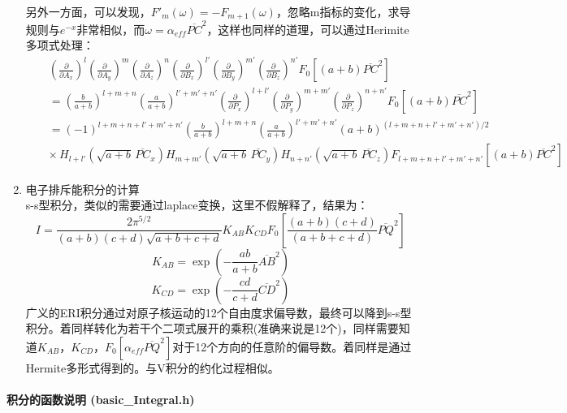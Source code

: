 \documentclass[11pt]{article}
\begin{document}
\begin{enumerate}
\[\begin{eqnarray}
  \end{eqnarray}\]
  另外一方面，可以发现，\(F'_m(\omega)=- F_{m+1}(\omega)\)，忽略m指标的变化，求导规则与\(e^{-x}\)非常相似，而\(\omega=\alpha_{eff}\overline{PC}^2\)，这样也同样的道理，可以通过Herimite多项式处理：
  \[\begin{eqnarray}
  &&(\frac{\partial}{\partial A_x})^l(\frac{\partial}{\partial A_y})^m(\frac{\partial}{\partial A_z})^n
  (\frac{\partial}{\partial B_x})^{l'}(\frac{\partial}{\partial B_y})^{m'}(\frac{\partial}{\partial B_z})^{n'}
  F_0[(a+b)\overline{PC}^2] \\
  &&= (\frac{b}{a+b})^{l+m+n}(\frac{a}{a+b})^{l'+m'+n'}(\frac{\partial}{\partial P_x})^{l+l'}(\frac{\partial}{\partial P_y})^{m+m'}(\frac{\partial}{\partial P_z})^{n+n'} F_0[(a+b)\overline{PC}^2] \\
  &&= (-1)^{l+m+n+l'+m'+n'}(\frac{b}{a+b})^{l+m+n}(\frac{a}{a+b})^{l'+m'+n'}(a+b)^{(l+m+n+l'+m'+n')/2} \\
  &&\times \,H_{l+l'}(\sqrt{a+b}\,\overline{PC}_x)H_{m+m'}(\sqrt{a+b}\,\overline{PC}_y)H_{n+n'}(\sqrt{a+b}\,\overline{PC}_z) F_{l+m+n+l'+m'+n'}[(a+b)\overline{PC}^2]
  \end{eqnarray}\]
\item
  电子排斥能积分的计算\\
  s-s型积分，类似的需要通过laplace变换，这里不假解释了，结果为：
  \[I=\frac{2\pi^{5/2}}{(a+b)(c+d)\sqrt{a+b+c+d}} K_{AB} K_{CD} F_0[\frac{(a+b)(c+d)}{(a+b+c+d)}\overline{PQ}^2]\]
  \[K_{AB}=\exp(-\frac{ab}{a+b}\overline{AB}^2)\]
  \[K_{CD}=\exp(-\frac{cd}{c+d}\overline{CD}^2)\]
  广义的ERI积分通过对原子核运动的12个自由度求偏导数，最终可以降到s-s型积分。着同样转化为若干个二项式展开的乘积(准确来说是12个)，同样需要知道\(K_{AB}\)，\(K_{CD}\)，\(F_0[\alpha_{eff}\overline{PQ}^2]\)对于12个方向的任意阶的偏导数。着同样是通过Hermite多形式得到的。与V积分的约化过程相似。
\end{enumerate}

    \paragraph{\texorpdfstring{积分的函数说明
(\textbf{basic\_Integral.h})}{积分的函数说明 (basic\_Integral.h)}}\label{ux79efux5206ux7684ux51fdux6570ux8bf4ux660e-basic_integral.h}
\end{document}
